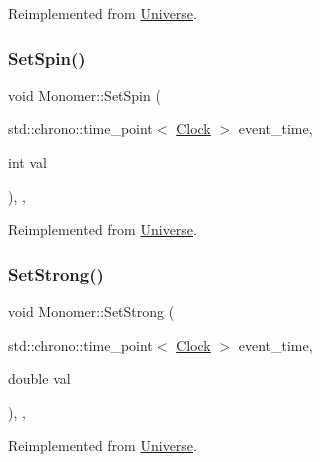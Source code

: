 Reimplemented from \mbox{\hyperlink{classUniverse_ae0cb8d86b2fbb8396d605160344b42f5}{Universe}}.

\mbox{\label{classMonomer_ad24a86a4c1ac62d1b0ce8040d6b08adf}} 
\subsubsection{\texorpdfstring{Set\+Spin()}{SetSpin()}}
{\footnotesize\ttfamily void Monomer\+::\+Set\+Spin (\begin{DoxyParamCaption}\item[{std\+::chrono\+::time\+\_\+point$<$ \mbox{\hyperlink{universe_8h_a0ef8d951d1ca5ab3cfaf7ab4c7a6fd80}{Clock}} $>$}]{event\+\_\+time,  }\item[{int}]{val }\end{DoxyParamCaption})\hspace{0.3cm}{\ttfamily [inline]}, {\ttfamily [final]}, {\ttfamily [virtual]}}



Reimplemented from \mbox{\hyperlink{classUniverse_ae2ae1c3b3e4cde2c18f5f6a814761ec8}{Universe}}.

\mbox{\label{classMonomer_a10b864f6bcad43f11a2316dbbe4c4742}} 
\subsubsection{\texorpdfstring{Set\+Strong()}{SetStrong()}}
{\footnotesize\ttfamily void Monomer\+::\+Set\+Strong (\begin{DoxyParamCaption}\item[{std\+::chrono\+::time\+\_\+point$<$ \mbox{\hyperlink{universe_8h_a0ef8d951d1ca5ab3cfaf7ab4c7a6fd80}{Clock}} $>$}]{event\+\_\+time,  }\item[{double}]{val }\end{DoxyParamCaption})\hspace{0.3cm}{\ttfamily [inline]}, {\ttfamily [final]}, {\ttfamily [virtual]}}



Reimplemented from \mbox{\hyperlink{classUniverse_a5946c8f3d4cda305f3ecd10df21a2f94}{Universe}}.

\mbox{\label{classMonomer_ad9df06c1a8264bfdb514ef3ba04ef4c7}} 
